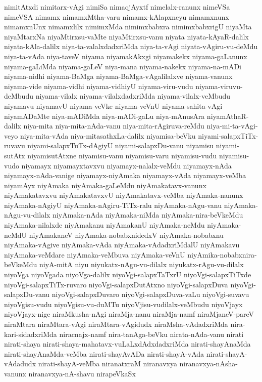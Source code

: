 {nimitAtxdi
nimitarx-vAgi
nimiSa
nimaqjAyxtf
nimelalx-ranunx
nimeVSa
nimeVSA
nimamx
nimamxMtha-varu
nimamx-kAlapxneyu
nimamxnunx
nimamxnUnx
nimamxlilx
nimimxMda
nimimxbabxra
nimimxbabxrigU
niyaMta
niyaMtarxNa
niyaMtirxsu-vaMte
niyaMtirxsu-vanu
niyata
niyata-kAyaR-dalilx
niyata-kAla-dalilx
niya-ta-valalxdadxriMda
niya-ta-vAgi
niyata-vAgiru-vu-deMdu
niya-ta-vAda
niya-taveV
niyama
niyamakAkxgi
niyamakekx
niyama-gaLanunx
niyama-gaLiMda
niyama-gaLeV
niya-mana
niyama-nakekx
niyama-na-mADi
niyama-nidhi
niyama-BaMga
niyama-BaMga-vAgalilalxve
niyama-vanunx
niyama-vide
niyama-vidhi
niyama-vidhiyU
niyama-viru-vudu
niyama-viruvu-deMbudu
niyama-vilalx
niyama-vilalxdadxriMda
niyama-vilalx-veMbudu
niyamavu
niyamavU
niyama-veVke
niyama-veVnU
niyama-sahita-vAgi
niyamADaMte
niya-mADiMda
niya-mADi-gaLu
niya-mAnusAra
niyamAthaR-dalilx
niya-mita
niya-mita-nAda-vanu
niya-mita-rAgiruva-reMdu
niya-mi-ta-vAgi-veyo
niya-mita-vAda
niya-mitasathxLa-dalilx
niyamisa-beVku
niyami-salapxTiTx-ruvavu
niyami-salapxTuTx-dAgiyU
niyami-salapxDu-vanu
niyamisu
niyami-sutAtx
niyamisutAtxne
niyamisu-vanu
niyamisu-varu
niyamisu-vudu
niyamisu-vudo
niyamayx
niyamayxtavxvu
niyamayx-nalalx-veMdu
niyamayx-nAda
niyamayx-nAda-vanige
niyamayx-niyAmaka
niyamayx-vAda
niyamayx-veMba
niyamAyx
niyAmaka
niyAmaka-gaLeMdu
niyAmakatavx-vanunx
niyAmakatavxvu
niyAmakatavxvU
niyAmakatavx-veMba
niyAmaka-nanunx
niyAmaka-nAgiyU
niyAmaka-nAgiru-TiTx-ralu
niyAmaka-nAgu-vanu
niyAmaka-nAgu-vu-dilalx
niyAmaka-nAda
niyAmaka-niMda
niyAmaka-nira-beVkeMdu
niyAmaka-nilalxde
niyAmakanu
niyAmakanU
niyAmaka-neMdu
niyAmaka-neMdU
niyAmakaneV
niyAmaka-nobabxnidedxV
niyAmaka-nobabxnu
niyAmaka-vAgive
niyAmaka-vAda
niyAmaka-vAdadxriMdalU
niyAmakavu
niyAmaka-veMdare
niyAmaka-veMbuva
niyAmaka-veVnU
niyAmika-nobabxnira-beVkeMdu
niyA-mitA
niyu
niyukatx-nAgu-vu-dilalx
niyukatx-rAgu-vu-dilalx
niyoVga
niyoVgada
niyoVga-dalilx
niyoVgi-salapxTaTxrU
niyoVgi-salapxTiTxde
niyoVgi-salapxTiTx-ruvaro
niyoVgi-salapxDutAtxno
niyoVgi-salapxDuva
niyoVgi-salapxDu-vanu
niyoVgi-salapxDuvaro
niyoVgi-salapxDuva-vaLu
niyoVgi-suvavu
niyoVgisu-vudu
niyoVgisu-vu-duMTu
niyoVjisu-vudilalx-veMbudu
niyoVjayx
niyoVjayx-nige
niraMkusha-nAgi
niraMja-nanu
niraMja-namf
niraMjaneV-pareV
niraMtara
niraMtara-vAgi
niraMtara-vAgidudx
niraMsha-vAdadxriMda
nira-kari-sidadxriMda
niracnajx-namf
nira-tanAga-beVku
nirata-nAda-vanu
nirati
nirati-shaya
nirati-shaya-mahatavx-vuLaLxdAdxdadxriMda
nirati-shayAnaMda
nirati-shayAnaMda-veMba
nirati-shayAvADa
nirati-shayA-vAda
nirati-shayA-vAdadudx
nirati-shayA-veMba
niranatxraM
niranavxya
niranavxya-nAsha-vanunx
niranavxya-nA-shavu
nirapeVkaSx
}

